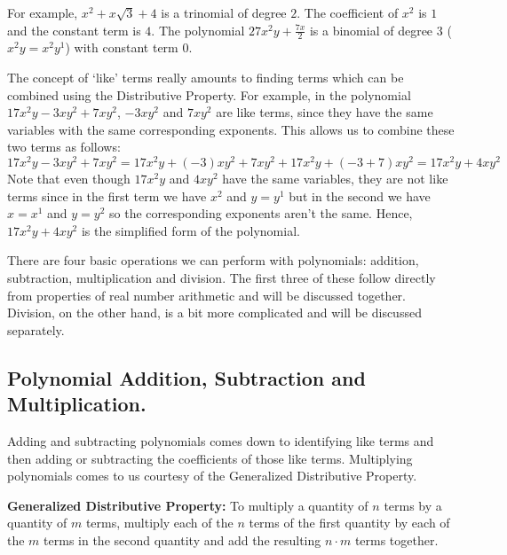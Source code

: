 \documentclass{ximera}
\begin{document}

 

For example, $x^2 + x\sqrt{3} +4$ is a trinomial of degree $2$.  The coefficient of $x^2$ is $1$ and the constant term is $4$.  The polynomial $27x^2y + \frac{7x}{2}$ is a binomial of degree $3$ ($x^2y = x^2 y^1$) with constant term $0$.  

 

The concept of `like' terms really amounts to finding terms which can be combined using the Distributive Property.  For example, in the polynomial $17x^2y - 3xy^2 + 7xy^2$, $-3xy^2$ and $7xy^2$ are like terms, since they have the same variables with the same corresponding exponents. This allows us to combine these two terms as follows:  \[17x^2y -  3xy^2 + 7xy^2 = 17x^2y + (-3)xy^2 + 7xy^2 + 17x^2y +(-3 + 7)xy^2 = 17x^2y + 4xy^2\]  Note that even though $17x^2y$ and $4xy^2$ have the same variables, they are not like terms since in the first term we have $x^2$ and $y = y^1$ but in the second we have $x = x^1$ and $y = y^2$ so the corresponding exponents aren't the same.  Hence,  $17x^2y + 4xy^2$ is the simplified form of the polynomial.  

 

There are four basic operations we can perform with polynomials:  addition, subtraction, multiplication and division. The first three of these follow directly from properties of real number arithmetic and will be discussed together.  Division, on the other hand, is a bit more complicated and will be discussed separately.

\subsection{Polynomial Addition, Subtraction and Multiplication.}
\label{polyaddsubtmult}

Adding and subtracting polynomials comes down to identifying like terms and then adding or subtracting the coefficients of those like terms.  Multiplying polynomials comes to us courtesy of the Generalized Distributive Property.

 


\begin{theorem}\label{generaldistprop} \textbf{Generalized Distributive Property:}  To multiply a quantity of $n$ terms by a quantity of $m$ terms, multiply each of the $n$ terms of the first quantity by each of the $m$ terms in the second quantity and add the resulting $n \cdot m$ terms together. 

\end{theorem}
\end{document}
